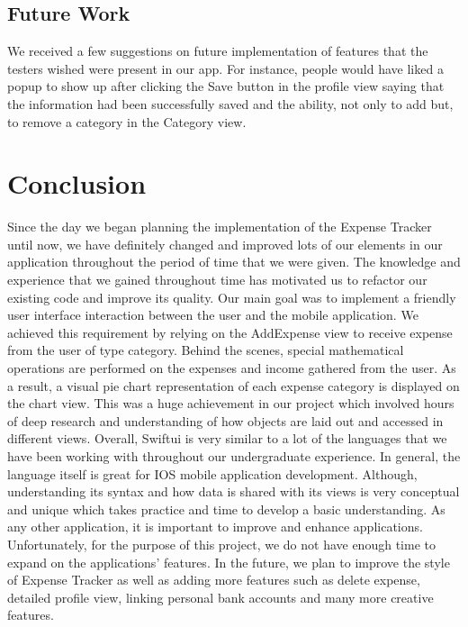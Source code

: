 \documentclass{article}
\begin{document}
\subsection{Future Work}
We received a few suggestions on future implementation of features that the testers wished were present in our app. For instance, people would have liked a popup to show up after clicking the Save button in the profile view saying that the information had been successfully saved and the ability, not only to add but, to remove a category in the Category view.

\section{Conclusion}
Since the day we began planning the implementation of the Expense Tracker until now, we have definitely changed and improved lots of our elements in our application throughout the period of time that we were given. The knowledge and experience that we gained throughout time has motivated us to refactor our existing code and improve its quality. Our main goal was to implement a friendly user interface interaction between the user and the mobile application. We achieved this requirement by relying on the AddExpense view to receive expense from the user of type category. Behind the scenes, special mathematical operations are performed on the expenses and income gathered from the user. As a result, a visual pie chart representation of each expense category is displayed on the chart view. This was a huge achievement in our project which involved hours of deep research and understanding of how objects are laid out and accessed in different views. Overall, Swiftui is very similar to a lot of the languages that we have been working with throughout our undergraduate experience. In general, the language itself is great for IOS mobile application development. Although, understanding its syntax and how data is shared with its views is very conceptual and unique which takes practice and time to develop a basic understanding. As any other application, it is important to improve and enhance applications. Unfortunately, for the purpose of this project, we do not have enough time to expand on the applications’ features. In the future, we plan to improve the style of Expense Tracker as well as adding more features such as delete expense, detailed profile view, linking personal bank accounts and many more creative features.




\end{document}
